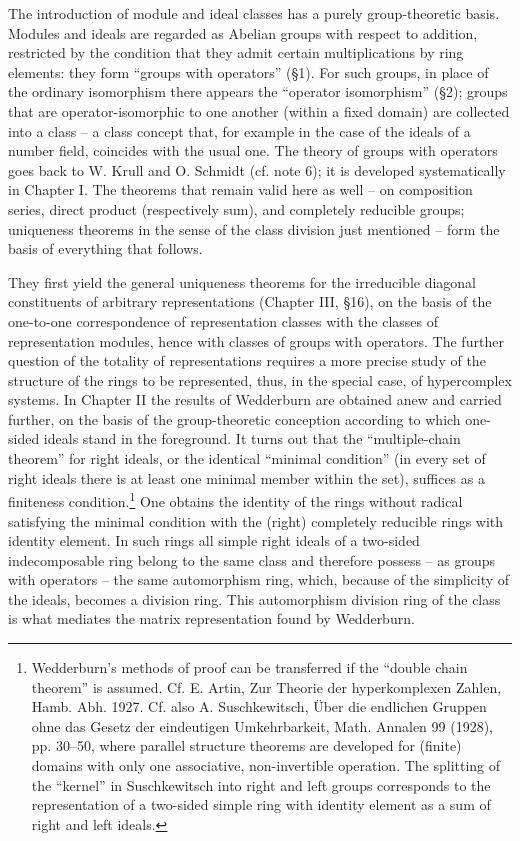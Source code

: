 \documentclass[11pt]{article}
\begin{document}
The introduction of module and ideal classes has a purely group-theoretic basis. Modules and ideals are regarded as Abelian groups with respect to addition, restricted by the condition that they admit certain multiplications by ring elements: they form ``groups with operators'' (§1). For such groups, in place of the ordinary isomorphism there appears the ``operator isomorphism'' (§2); groups that are operator-isomorphic to one another (within a fixed domain) are collected into a class -- a class concept that, for example in the case of the ideals of a number field, coincides with the usual one. The theory of groups with operators goes back to W. Krull and O. Schmidt (cf. note 6); it is developed systematically in Chapter I. The theorems that remain valid here as well -- on composition series, direct product (respectively sum), and completely reducible groups; uniqueness theorems in the sense of the class division just mentioned -- form the basis of everything that follows.

They first yield the general uniqueness theorems for the irreducible diagonal constituents of arbitrary representations (Chapter III, §16), on the basis of the one-to-one correspondence of representation classes with the classes of representation modules, hence with classes of groups with operators. The further question of the totality of representations requires a more precise study of the structure of the rings to be represented, thus, in the special case, of hypercomplex systems. In Chapter II the results of Wedderburn are obtained anew and carried further, on the basis of the group-theoretic conception according to which one-sided ideals stand in the foreground. It turns out that the ``multiple-chain theorem'' for right ideals, or the identical ``minimal condition'' (in every set of right ideals there is at least one minimal member within the set), suffices as a finiteness condition.\footnote{Wedderburn's methods of proof can be transferred if the ``double chain theorem'' is assumed. Cf. E. Artin, Zur Theorie der hyperkomplexen Zahlen, Hamb. Abh. 1927. Cf. also A. Suschkewitsch, Über die endlichen Gruppen ohne das Gesetz der eindeutigen Umkehrbarkeit, Math. Annalen 99 (1928), pp. 30--50, where parallel structure theorems are developed for (finite) domains with only one associative, non-invertible operation. The splitting of the ``kernel'' in Suschkewitsch into right and left groups corresponds to the representation of a two-sided simple ring with identity element as a sum of right and left ideals.} One obtains the identity of the rings without radical satisfying the minimal condition with the (right) completely reducible rings with identity element. In such rings all simple right ideals of a two-sided indecomposable ring belong to the same class and therefore possess -- as groups with operators -- the same automorphism ring, which, because of the simplicity of the ideals, becomes a division ring. This automorphism division ring of the class is what mediates the matrix representation found by Wedderburn.
\end{document}
